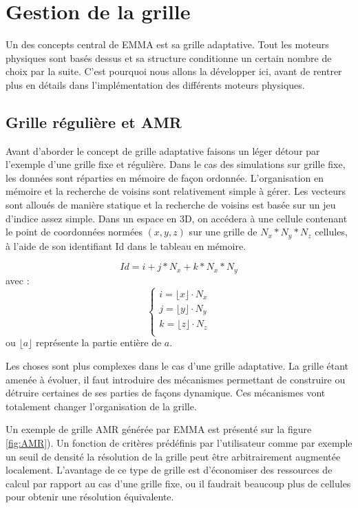 \section{Gestion de la grille}
\label{sec_gestion_grille}

Un des concepts central de EMMA est sa grille adaptative.
Tout les moteurs physiques sont basés dessus et sa structure conditionne un certain nombre de choix par la suite.
C'est pourquoi nous allons la développer ici, avant de rentrer plus en détails dans l'implémentation des différents moteurs physiques.

\subsection{Grille régulière et AMR}
Avant d'aborder le concept de grille adaptative faisons un léger détour par l'exemple d'une grille fixe et régulière.
Dans le cas des simulations sur grille fixe, les données sont réparties en mémoire de façon ordonnée.
L'organisation en mémoire et la recherche de voisins sont relativement simple à gérer.
Les vecteurs sont alloués de manière statique et la recherche de voisins est basée sur un jeu d'indice assez simple.
Dans un espace en 3D, on accédera à une cellule contenant le point de coordonnées normées $(x,y,z)$ sur une grille de $N_x*N_y*N_z$ cellules, à l'aide de son identifiant Id dans le tableau en mémoire.

\begin{equation}
Id = i + j*N_x + k * N_x*N_y
\end{equation}
avec :
\begin{equation}
\begin{cases}
i=\lfloor x \rfloor \cdot N_x \\
j=\lfloor y \rfloor \cdot N_y \\
k=\lfloor z \rfloor \cdot N_z \\
\end{cases}
\end{equation}
ou $\lfloor a \rfloor$ représente la partie entière de $a$.

Les choses sont plus complexes dans le cas d'une grille adaptative.
La grille étant amenée à évoluer, il faut introduire des mécanismes permettant de construire ou détruire certaines de ses parties de façons dynamique.
Ces mécanismes vont totalement changer l'organisation de la grille.

Un exemple de grille \ac{AMR} générée par EMMA est présenté sur la figure \ref{fig:AMR}).
Un fonction de critères prédéfinis par l'utilisateur comme par exemple un seuil de densité la résolution de la grille peut être arbitrairement augmentée localement.
L'avantage de ce type de grille est d'économiser des ressources de calcul par rapport au cas d'une grille fixe, ou il faudrait beaucoup plus de cellules pour obtenir une résolution équivalente.

